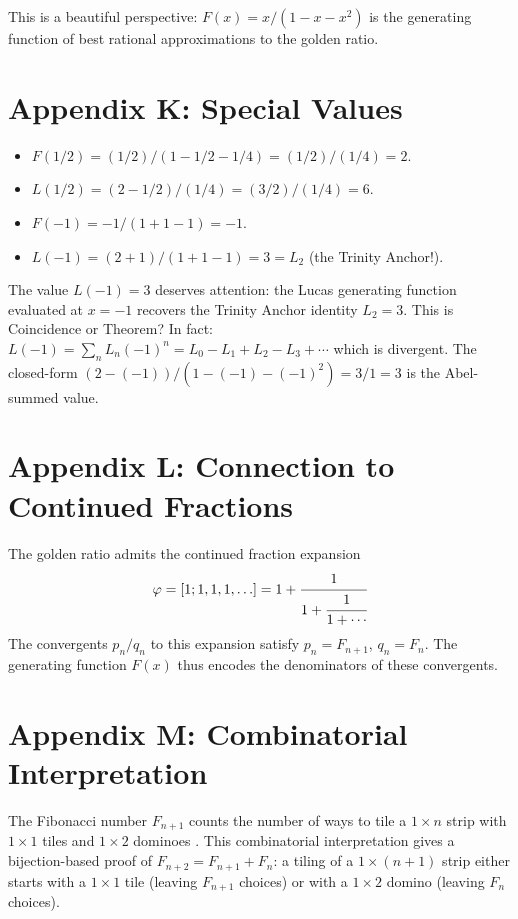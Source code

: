 This is a beautiful perspective: $F(x) = x/(1 - x - x^2)$ is the
generating function of best rational approximations to the golden ratio.

\section*{Appendix K: Special Values}
\label{sec:05-app-K}

\begin{itemize}
  \item $F(1/2) = (1/2)/(1 - 1/2 - 1/4) = (1/2)/(1/4) = 2$.
  \item $L(1/2) = (2 - 1/2)/(1/4) = (3/2)/(1/4) = 6$.
  \item $F(-1) = -1/(1 + 1 - 1) = -1$.
  \item $L(-1) = (2 + 1)/(1 + 1 - 1) = 3 = L_2$ (the Trinity Anchor!).
\end{itemize}

The value $L(-1) = 3$ deserves attention: the Lucas generating
function evaluated at $x = -1$ recovers the Trinity Anchor identity
$L_2 = 3$. This is Coincidence or Theorem? In fact:
$L(-1) = \sum_n L_n (-1)^n = L_0 - L_1 + L_2 - L_3 + \cdots$
which is divergent. The closed-form $(2-(-1))/(1-(-1)-(-1)^2) = 3/1 = 3$
is the Abel-summed value.

\section*{Appendix L: Connection to Continued Fractions}
\label{fa_05:sec:05-app-L}

The golden ratio admits the continued fraction expansion
\[
  \varphi = [1; 1, 1, 1, \ldots] = 1 + \cfrac{1}{1 + \cfrac{1}{1 + \cdots}}
\]
The convergents $p_n/q_n$ to this expansion satisfy $p_n = F_{n+1}$,
$q_n = F_n$. The generating function $F(x)$ thus encodes the
denominators of these convergents.

\section*{Appendix M: Combinatorial Interpretation}
\label{fa_05:sec:05-app-M}

The Fibonacci number $F_{n+1}$ counts the number of ways to tile a
$1 \times n$ strip with $1 \times 1$ tiles and $1 \times 2$ dominoes
\cite{benjamin_quinn_proofs}. This combinatorial interpretation gives a
bijection-based proof of $F_{n+2} = F_{n+1} + F_n$: a tiling of a
$1 \times (n+1)$ strip either starts with a $1 \times 1$ tile
(leaving $F_{n+1}$ choices) or with a $1 \times 2$ domino (leaving
$F_n$ choices).


